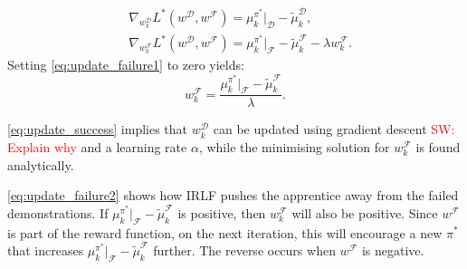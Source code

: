 \documentclass[letterpaper]{article}
\newcommand{\sw}[1]{\textcolor{red}{SW: #1}}
\newcommand{\ks}[1]{\textcolor{green}{Kyriacos: #1}}
\newcommand{\sw}[1]{}
\newcommand{\ks}[1]{}
\begin{document}
\begin{align}
	&\nabla_{w^{\mathcal{D}}_k}L^*(w^{\mathcal{D}},w^{\mathcal{F}}) = \mu^{\pi^*}_ k|_{\mathcal{D}}- \widetilde{\mu}^{\mathcal{D}}_k \label{eq:update_success},\\
		&\nabla_{w^{\mathcal{F}}_k}L^*(w^{\mathcal{D}},w^{\mathcal{F}}) = \mu^{\pi^*}_k|_{\mathcal{F}} - \widetilde{\mu}^{\mathcal{F}}_k - \lambda w^{\mathcal{F}}_k. \label{eq:update_failure1}
\end{align}
Setting \eqref{eq:update_failure1} to zero yields:
\begin{equation}
  \label{eq:update_failure2}
  w^{\mathcal{F}}_k = \frac{\mu^{\pi^*}_k|_{\mathcal{F}} - \widetilde{\mu}^{\mathcal{F}}_k}{\lambda}.
\end{equation}
%

\noindent \eqref{eq:update_success} implies that $w^{\mathcal{D}}_k$ can be updated using gradient descent \sw{Explain why} and a learning rate $\alpha$, %
while the minimising solution for $w^{\mathcal{F}}_k$ is found analytically.

\eqref{eq:update_failure2} shows how IRLF pushes the apprentice away from the failed demonstrations.  If $\mu^{\pi^*}_k|_{\mathcal{F}} - \widetilde{\mu}^{\mathcal{F}}_k$ is positive, then $w^{\mathcal{F}}_k$ will also be positive.  Since $w^{\mathcal{F}}$ is part of the reward function, on the next iteration, this will encourage a new $\pi^*$ that increases $\mu^{\pi^*}_k|_{\mathcal{F}} - \widetilde{\mu}^{\mathcal{F}}_k$ further.  The reverse occurs when $w^{\mathcal{F}}$ is negative.
\end{document}
